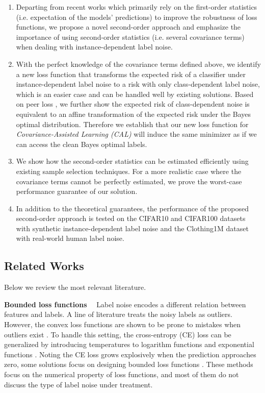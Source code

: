 \documentclass[final]{cvpr}
\newcommand{\rev}[1]{{\color{blue}#1}}
\newcommand{\rev}[1]{#1}
\newcounter{list}
\begin{document}
\begin{enumerate}[itemsep = -5pt, topsep = -7pt, leftmargin = 12pt]
    \item Departing from recent works \cite{sieve2020,liu2019peer,natarajan2013learning,patrini2017making,vahdat2017toward,xia2020parts,xiao2015learning} which primarily rely on the first-order statistics (i.e. expectation of the models' predictions) to improve the robustness of loss functions, we propose a novel second-order approach and emphasize the importance of using second-order statistics \rev{(i.e. several covariance terms)} when dealing with instance-dependent label noise. \item 
    \rev{With the perfect knowledge of the covariance terms defined above, we identify a new loss  function that transforms the expected risk of a classifier under instance-dependent label noise to a risk with only class-dependent label noise, which is an easier case and can be handled well by existing solutions. Based on peer loss \cite{liu2019peer}, we further show the expected risk of class-dependent noise is equivalent to an affine transformation of the expected risk under the Bayes optimal distribution.
    Therefore we establish that our new loss function for \emph{Covariance-Assisted Learning (CAL)} will induce the same minimizer as if we can access the clean Bayes optimal labels.}
    \item  We show how the second-order statistics can be estimated efficiently using existing sample selection techniques. For a more realistic case where the covariance terms cannot be perfectly estimated, we prove the worst-case performance guarantee of our solution. 
    \item In addition to the theoretical guarantees, the performance of the proposed second-order approach is tested on the CIFAR10 and CIFAR100 datasets with synthetic instance-dependent label noise and the Clothing1M dataset with real-world human label noise. 
\end{enumerate}




\subsection{Related Works}


Below we review the most relevant literature. 

\noindent\textbf{Bounded loss functions}~~
Label noise encodes a different relation between features and labels. A line of literature treats the noisy labels as outliers.
However, the convex loss functions are shown to be prone to mistakes when outliers exist \cite{long2010random}.
To handle this setting, the cross-entropy (CE) loss can be generalized by introducing temperatures to  logarithm functions and exponential functions \cite{amid2019robust,amid2019two,zhang2018generalized}.
Noting the CE loss grows explosively when the prediction  approaches zero, some solutions focus on designing bounded loss functions \cite{ghosh2017robust,gong2018decomposition,shu2020learning,wang2019symmetric}.
These methods focus on the numerical property of loss functions, and most of them do not discuss the type of label noise under treatment.
\end{document}
